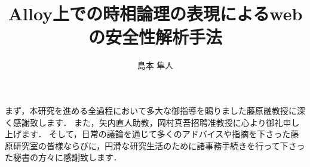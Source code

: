 \documentclass[12pt,a4paper]{jbook}
\title{Alloy上での時相論理の表現によるwebの安全性解析手法}
\author{島本 隼人}
\begin{document}
\coverpage
\tableofcontents
\listoffigures
\listoftables
\body








\acknowledgement
まず，本研究を進める全過程において多大な御指導を賜りました藤原融教授に深く感謝致します．
また，矢内直人助教，岡村真吾招聘准教授に心より御礼申し上げます．
そして，日常の議論を通じて多くのアドバイスや指摘を下さった藤原研究室の皆様ならびに，円滑な研究生活のために諸事務手続きを行って下さった秘書の方々に感謝致します．


 
\end{document}
